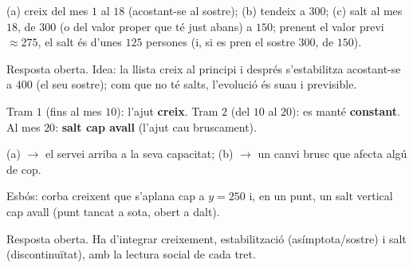\begin{solucions}
\begin{sollist}
  \item (a) creix del mes $1$ al $18$ (acostant-se al sostre); (b) tendeix a $300$;
        (c) salt al mes $18$, de $300$ (o del valor proper que té just abans) a $150$;
        prenent el valor previ $\approx 275$, el salt és d'unes $125$ persones (i, si es
        pren el sostre $300$, de $150$).
  \item Resposta oberta. Idea: la llista creix al principi i després s'estabilitza
        acostant-se a $400$ (el seu sostre); com que no té salts, l'evolució és suau i
        previsible.
  \item Tram $1$ (fins al mes $10$): l'ajut \textbf{creix}. Tram $2$ (del $10$ al $20$):
        es manté \textbf{constant}. Al mes $20$: \textbf{salt cap avall} (l'ajut cau
        bruscament).
  \item (a) $\rightarrow$ el servei arriba a la seva capacitat; \quad
        (b) $\rightarrow$ un canvi brusc que afecta algú de cop.
  \item Esbós: corba creixent que s'aplana cap a $y=250$ i, en un punt, un salt
        vertical cap avall (punt tancat a sota, obert a dalt).
  \item Resposta oberta. Ha d'integrar creixement, estabilització (asímptota/sostre) i
        salt (discontinuïtat), amb la lectura social de cada tret.
\end{sollist}
\end{solucions}
